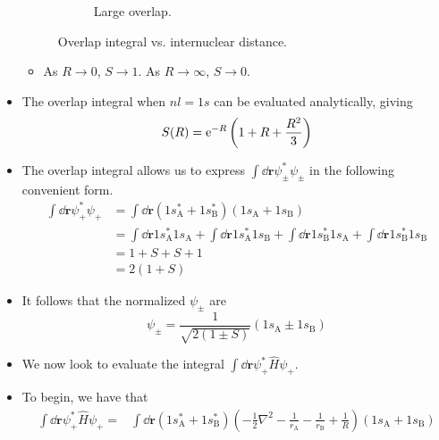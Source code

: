 \documentclass[../notes.tex]{subfiles}
\begin{document}
\begin{itemize}
\begin{figure}[h!]
\begin{subfigure}[b]{0.4\linewidth}
            \caption{Large overlap.}
            \label{fig:overlapIntegralb}
        \end{subfigure}
        \caption{Overlap integral vs. internuclear distance.}
        \label{fig:overlapIntegral}
    \end{figure}
    \begin{itemize}
        \item As $R\to 0$, $S\to 1$. As $R\to\infty$, $S\to 0$.
    \end{itemize}
    \item The overlap integral when $nl=1s$ can be evaluated analytically, giving
    \begin{equation*}
        S(R) = \e[-R]\left( 1+R+\frac{R^2}{3} \right)
    \end{equation*}
    \item The overlap integral allows us to express $\int\dd{\mathbf{r}}\psi_\pm^*\psi_\pm$ in the following convenient form.
    \begin{align*}
        \int\dd{\mathbf{r}}\psi_+^*\psi_+ &= \int\dd{\mathbf{r}}(1s_\text{A}^*+1s_\text{B}^*)(1s_\text{A}+1s_\text{B})\\
        &= \int\dd{\mathbf{r}}1s_\text{A}^*1s_\text{A}+\int\dd{\mathbf{r}}1s_\text{A}^*1s_\text{B}+\int\dd{\mathbf{r}}1s_\text{B}^*1s_\text{A}+\int\dd{\mathbf{r}}1s_\text{B}^*1s_\text{B}\\
        &= 1+S+S+1\\
        &= 2(1+S)
    \end{align*}
    \item It follows that the normalized $\psi_\pm$ are
    \begin{equation*}
        \psi_\pm = \frac{1}{\sqrt{2(1\pm S)}}(1s_\text{A}\pm 1s_\text{B})
    \end{equation*}
    \item {}We now look to evaluate the integral $\int\dd{\mathbf{r}}\psi_+^*\hat{H}\psi_+$.
    \item To begin, we have that
    \begin{align*}
        \int\dd{\mathbf{r}}\psi_+^*\hat{H}\psi_+ ={}& \int\dd{\mathbf{r}}(1s_\text{A}^*+1s_\text{B}^*)\left( -\frac{1}{2}\nabla^2-\frac{1}{r_\text{A}}-\frac{1}{r_\text{B}}+\frac{1}{R} \right)(1s_\text{A}+1s_\text{B})\\

\end{align*}
\end{itemize}
\end{document}
